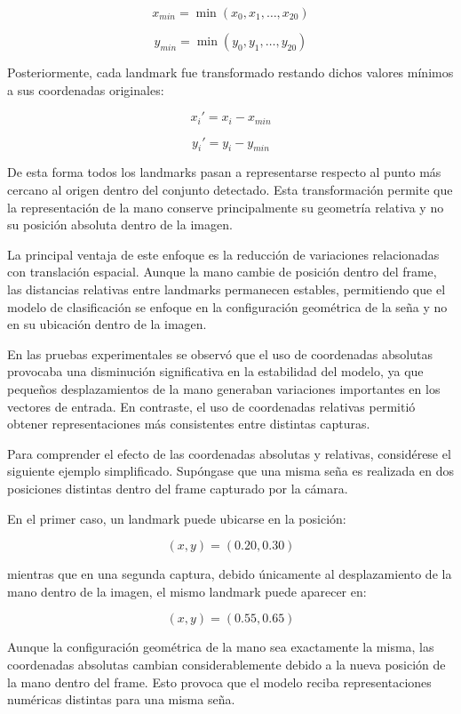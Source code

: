 	\[
	x_{min} = \min(x_0,x_1,\ldots,x_{20})
	\]
	
	\[
	y_{min} = \min(y_0,y_1,\ldots,y_{20})
	\]
	
	Posteriormente, cada landmark fue transformado restando dichos valores mínimos a
	sus coordenadas originales:
	
	\[
	x_i' = x_i - x_{min}
	\]
	
	\[
	y_i' = y_i - y_{min}
	\]
	
	De esta forma todos los landmarks pasan a representarse respecto al punto más
	cercano al origen dentro del conjunto detectado. Esta transformación permite que
	la representación de la mano conserve principalmente su geometría relativa y no su
	posición absoluta dentro de la imagen.
	
	La principal ventaja de este enfoque es la reducción de variaciones relacionadas
	con translación espacial. Aunque la mano cambie de posición dentro del frame, las
	distancias relativas entre landmarks permanecen estables, permitiendo que el
	modelo de clasificación se enfoque en la configuración geométrica de la seña y no
	en su ubicación dentro de la imagen.
	
	En las pruebas experimentales se observó que el uso de coordenadas absolutas
	provocaba una disminución significativa en la estabilidad del modelo, ya que
	pequeños desplazamientos de la mano generaban variaciones importantes en los
	vectores de entrada. En contraste, el uso de coordenadas relativas permitió
	obtener representaciones más consistentes entre distintas capturas.
	
	Para comprender el efecto de las coordenadas absolutas y relativas, considérese
	el siguiente ejemplo simplificado. Supóngase que una misma seña es realizada en
	dos posiciones distintas dentro del frame capturado por la cámara.
	
	En el primer caso, un landmark puede ubicarse en la posición:
	
	\[
	(x,y)=(0.20,0.30)
	\]
	
	mientras que en una segunda captura, debido únicamente al desplazamiento de la
	mano dentro de la imagen, el mismo landmark puede aparecer en:
	
	\[
	(x,y)=(0.55,0.65)
	\]
	
	Aunque la configuración geométrica de la mano sea exactamente la misma, las
	coordenadas absolutas cambian considerablemente debido a la nueva posición de la
	mano dentro del frame. Esto provoca que el modelo reciba representaciones
	numéricas distintas para una misma seña.
	
